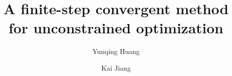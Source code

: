 \documentclass[final,1p,times]{elsarticle}
\begin{document}
\begin{frontmatter}

\title{A finite-step convergent method for unconstrained optimization}




\author[xtu]{Yunqing Huang }


\author[xtu]{Kai Jiang }


\address[xtu]{School of Mathematics and Computational
 Science, 
 \\
Hunan Key Laboratory for Computation and Simulation in Science
and Engineering, Xiangtan University, P.R. China, 411105
 }




\end{frontmatter}
\end{document}
